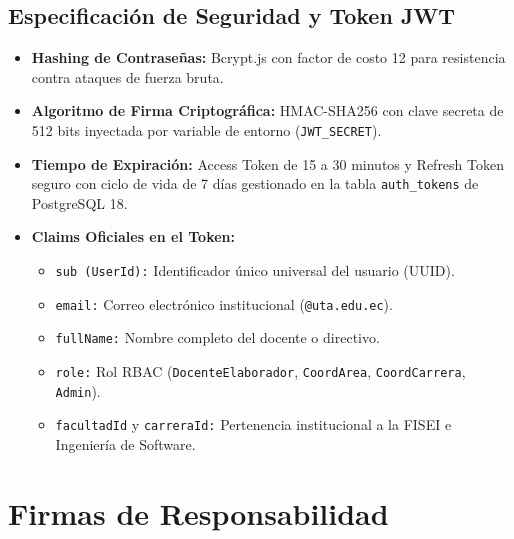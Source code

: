 \documentclass[11pt,a4paper]{article}
\begin{document}
\subsection{Especificación de Seguridad y Token JWT}
\begin{itemize}[leftmargin=1.5em, itemsep=2pt]
    \item \textbf{Hashing de Contraseñas:} Bcrypt.js con factor de costo 12 para resistencia contra ataques de fuerza bruta.
    \item \textbf{Algoritmo de Firma Criptográfica:} HMAC-SHA256 con clave secreta de 512 bits inyectada por variable de entorno (\texttt{JWT\_SECRET}).
    \item \textbf{Tiempo de Expiración:} Access Token de 15 a 30 minutos y Refresh Token seguro con ciclo de vida de 7 días gestionado en la tabla \texttt{auth\_tokens} de PostgreSQL 18.
    \item \textbf{Claims Oficiales en el Token:}
    \begin{itemize}[leftmargin=1.2em, itemsep=1pt]
        \item \texttt{sub (UserId):} Identificador único universal del usuario (UUID).
        \item \texttt{email:} Correo electrónico institucional (\texttt{@uta.edu.ec}).
        \item \texttt{fullName:} Nombre completo del docente o directivo.
        \item \texttt{role:} Rol RBAC (\texttt{DocenteElaborador}, \texttt{CoordArea}, \texttt{CoordCarrera}, \texttt{Admin}).
        \item \texttt{facultadId} y \texttt{carreraId:} Pertenencia institucional a la FISEI e Ingeniería de Software.
    \end{itemize}
\end{itemize}

\vspace{0.3cm}

\section{Firmas de Responsabilidad}
\end{document}
